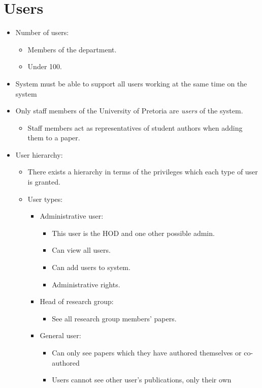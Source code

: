 \documentclass{article}
\begin{document}
\section{Users}\label{sec:users}
	\begin{itemize}
		\item Number of users:
		\begin{itemize}
			\item Members of the department.
			\item Under 100.
		\end{itemize}
		\item System must be able to support all users working at the same time on the system
		\item Only staff members of the University of Pretoria are \textit{users} of the system.
		\begin{itemize}
			\item Staff members act as representatives of student authors when adding them to a paper.
		\end{itemize}
		\item User hierarchy:
		\begin{itemize}
			\item There exists a hierarchy in terms of the privileges which each type of user is granted.
			\item User types:
			\begin{itemize}
				\item Administrative user:
				\begin{itemize}
					\item This user is the HOD and one other possible admin.
					\item Can view all users.
					\item Can add users to system.
					\item Administrative rights.
				\end{itemize}
				\item Head of research group:
				\begin{itemize}
					\item See all research group members' papers.
				\end{itemize}
				\item General user:
				\begin{itemize}
					\item Can only see papers which they have authored themselves or co-authored
					\item Users cannot see other user's publications, only their own
				\end{itemize}
			\end{itemize}
			
		\end{itemize}
	\end{itemize}
	
\end{document}
